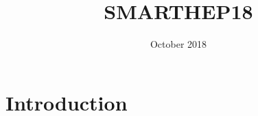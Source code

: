 \documentclass{article}
\title{SMARTHEP18}
\author{ }
\date{October 2018}
\begin{document}
\maketitle

\section{Introduction}
\end{document}
